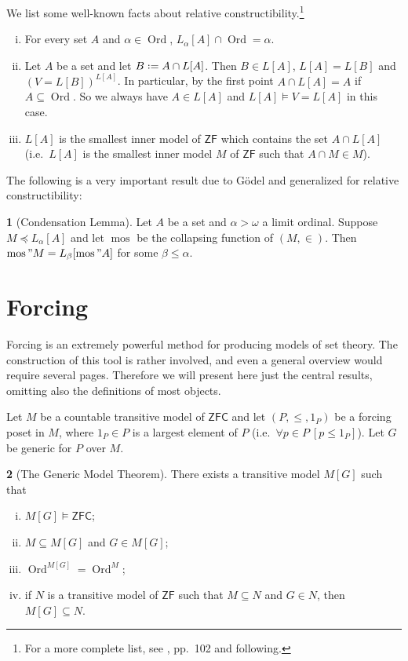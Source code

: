\documentclass[11pt,a4paper]{report}
\theoremstyle{definition}
\theoremstyle{num.custom-title}
\theoremstyle{custom-title}
\newtheorem*{teo_custom-title_nonum}{}
\DeclareMathOperator{\Ord}{\text{Ord}}
\DeclareMathOperator{\sse}{\subseteq}
\DeclareMathOperator{\mos}{mos}
\newcommand{\ZF}{\ensuremath{\mathsf{ZF}}\xspace}
\newcommand{\ZFC}{\ensuremath{\mathsf{ZFC}}\xspace}
\newcommand*{\defeq}{\mathrel{\rlap{%
                     \raisebox{0.3ex}{$\cdot$}}%
                     \raisebox{-0.3ex}{$\cdot$}}%
                     =}
\begin{document}
We list some well-known facts about relative constructibility.\footnote{For a more complete list, see \cite{Dev1984}, pp.\ 102 and following.}
\begin{enumerate}[i)]
\item For every set $A$ and $\alpha \in \Ord$, $L_\alpha [A] \cap \Ord = \alpha$.
\item Let $A$ be a set and let $B \defeq A \cap L[A]$. Then $B \in L[A]$, $L[A] = L[B]$ and $(V=L[B])^{L[A]}$. In particular, by the first point $A \cap L[A] = A$ if $A \sse \Ord$. So we always have $A \in L[A]$ and $L[A] \models V = L[A]$ in this case.
\item $L[A]$ is the smallest inner model of \ZF which contains the set $A \cap L[A]$ (i.e.\ $L[A]$ is the smallest inner model $M$ of \ZF such that $A \cap M \in M$).
\end{enumerate}

The following is a very important result due to Gödel and generalized for relative constructibility:

\begin{teo_custom-title_nonum}[Condensation Lemma]
Let $A$ be a set and $\alpha > \omega$ a limit ordinal. Suppose $M \preceq L_\alpha[A]$ and let $\mos$ be the collapsing function of $(M,\in)$. Then $\mos" M = L_\beta [\mos" A]$ for some $\beta \leq \alpha$.
\end{teo_custom-title_nonum}


\section*{Forcing}

Forcing is an extremely powerful method for producing models of set theory. The construction of this tool is rather involved, and even a general overview would require several pages. Therefore we will present here just the central results, omitting also the definitions of most objects.

Let $M$ be a countable transitive model of \ZFC and let $(P, \leq, 1_P)$ be a forcing poset in $M$, where $1_P \in P$ is a largest element of $P$ (i.e.\ $\forall p \in P \ [p \leq 1_P]$). Let $G$ be generic for $P$ over $M$.

\begin{teo_custom-title_nonum}[The Generic Model Theorem]
There exists a transitive model $M[G]$ such that
\begin{enumerate}[(i)]
\item $M[G] \models \ZFC$;
\item $M \sse M[G]$ and $G \in M[G]$;
\item $\Ord^{M[G]} = \Ord^M$;
\item if $N$ is a transitive model of \ZF such that $M \sse N$ and $G \in N$, then $M[G] \sse N$.
\end{enumerate}
\end{teo_custom-title_nonum}
\end{document}
